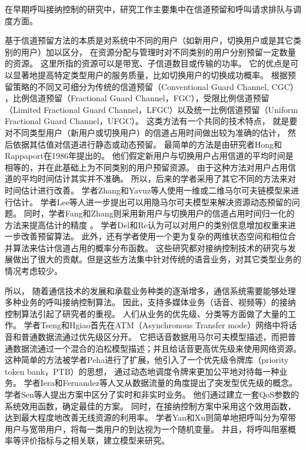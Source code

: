 在早期呼叫接纳控制的研究中，研究工作主要集中在信道预留和呼叫请求排队与调度方面。

基于信道预留方法的本质是对系统中不同的用户（如新用户，切换用户或是其它类别的用户）加以区分，
在资源分配与管理时对不同类别的用户分别预留一定数量的资源。
这里所指的资源可以是带宽、子信道数目或传输的功率。
它的优点是可以显著地提高特定类型用户的服务质量，比如切换用户的切换成功概率。
根据预留策略的不同又可细分为传统的信道预留（Conventional Guard Channel, CGC）
\cite{Hong:1986}\cite{Lunayach:1982}\cite{Posner:1985}，比例信道预留（Fractional Guard Channel，FGC）\cite{Ramjee:1997}\cite{Y-G-Fang.TVT.2002}\cite{Vazquez:2006}，受限比例信道预留（Limited Fractional Guard Channel，LFGC）\cite{CruzPerez:1999}以及统一比例信道预留（Uniform Fractional Guard Channel，UFGC）\cite{Beigy:2004}。
这类方法有一个共同的技术特点，
就是要对不同类型用户（新用户或切换用户）的信道占用时间做出较为准确的估计，
然后依据其估值对信道进行静态或动态预留。
最简单的方法是由研究者Hong和Rappaport在1986年提出的\cite{Hong:1986}。
他们假定新用户与切换用户占用信道的平均时间是相等的，并在此基础上为不同类别的用户预留资源。
由于这种方法对用户占用信道的平均时间估计其实并不准确。
所以，后来的学者采用了其它不同的方法来对时间估计进行改善。
学者Zhang和Yavuz等人使用一维或二维马尔可夫链模型来进行估计\cite{Zhang:2003}\cite{Yavuz:2006}\cite{Sindal:2008}。
学者Lee等人进一步提出可以用隐马尔可夫模型来解决资源动态预留的问题\cite{LeeWu2006}。
同时，学者Fang和Zhang则采用新用户与切换用户的信道占用时间归一化的方法来提高估计的精度 \cite{Y-G-Fang.TVT.2002}。
学者Del和Re认为可以对用户的类别信息增加权重来进一步改善预留算法\cite{Del1995}。
此外，还有学者使用一个更为复杂的两维状态空间和相位合并算法来估计信道占用的概率分布函数\cite{Melikov:2006}。
这些研究都对接纳控制技术的研究与发展做出了很大的贡献。但是这些方法集中针对传统的语音业务，对其它类型业务的情况考虑较少。

所以，
随着通信技术的发展和承载业务种类的逐渐增多，通信系统需要能够处理多种业务的呼叫接纳控制算法。
因此，支持多媒体业务（话音、视频等）的接纳控制算法引起了研究者的重视。
人们从业务的优先级、分类等方面做了大量的工作。
学者Tseng和Hgiao首先在ATM（Asynchronous Transfer mode）网络中将话音和普通数据流通过优先级区分开。
它把话音数据用马尔可夫模型描述，而把普通数据流通过一个混合的泊松模型描述；并且给话音更高优先级来使用网络资源\cite{Tseng:1991}。
这种简单的方法被学者Peha进行了扩展，他引入了一个优先级令牌库（priority token bank，PTB）的思想，
通过动态地调度令牌来更加公平地对待每一种业务\cite{Peha:1993}。
学者Iera和Fernandez等人又从数据流量的角度提出了突发型优先级的概念\cite{Iera:1996}\cite{Fernandez:1997}。
学者Sen等人提出方案中区分了实时和非实时业务。
他们通过建立一套QoS参数的系统效用函数，确定最佳的方案。
同时，在接纳控制方案中采用这个效用函数，达到最大程度地改善无线资源的利用率\cite{Sen:1998}。
学者Yan和Xu则简单地把呼叫分为窄带用户与宽带用户，将每一类用户的到达视为一个随机变量。
并且，将呼叫阻塞概率等评价指标与之相关联，建立模型来研究\cite{Yan:2008}\cite{Xu:2007}。

